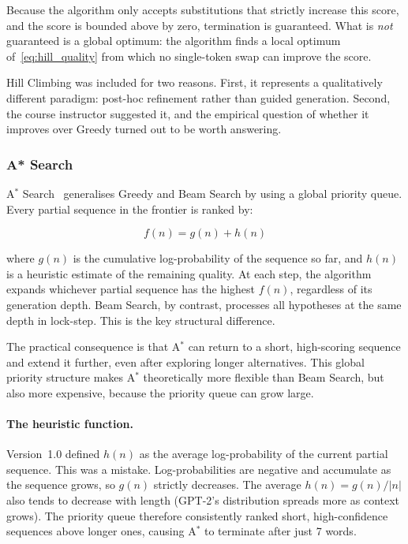 \documentclass[12pt]{article}
\begin{document}
	Because the algorithm only accepts substitutions that strictly increase this score, and the score is bounded above by zero, termination is guaranteed. What is \emph{not} guaranteed is a global optimum: the algorithm finds a local optimum of~\eqref{eq:hill_quality} from which no single-token swap can improve the score.
	
	Hill Climbing was included for two reasons. First, it represents a qualitatively different paradigm: post-hoc refinement rather than guided generation. Second, the course instructor suggested it, and the empirical question of whether it improves over Greedy turned out to be worth answering.
	
	\subsubsection{A* Search}
	\label{sec:astar_theory}
	
	A$^*$ Search~\cite{hart1968astar} generalises Greedy and Beam Search by using a global priority queue. Every partial sequence in the frontier is ranked by:
	
	\begin{equation}
		f(n) = g(n) + h(n)
		\label{eq:astar_f}
	\end{equation}
	
	where $g(n)$ is the cumulative log-probability of the sequence so far, and $h(n)$ is a heuristic estimate of the remaining quality. At each step, the algorithm expands whichever partial sequence has the highest $f(n)$, regardless of its generation depth. Beam Search, by contrast, processes all hypotheses at the same depth in lock-step. This is the key structural difference.
	
	The practical consequence is that A$^*$ can return to a short, high-scoring sequence and extend it further, even after exploring longer alternatives. This global priority structure makes A$^*$ theoretically more flexible than Beam Search, but also more expensive, because the priority queue can grow large.
	
	\paragraph{The heuristic function.}
	Version~1.0 defined $h(n)$ as the average log-probability of the current partial sequence. This was a mistake. Log-probabilities are negative and accumulate as the sequence grows, so $g(n)$ strictly decreases. The average $h(n) = g(n) / |n|$ also tends to decrease with length (GPT-2's distribution spreads more as context grows). The priority queue therefore consistently ranked short, high-confidence sequences above longer ones, causing A$^*$ to terminate after just 7 words.
	
\end{document}

